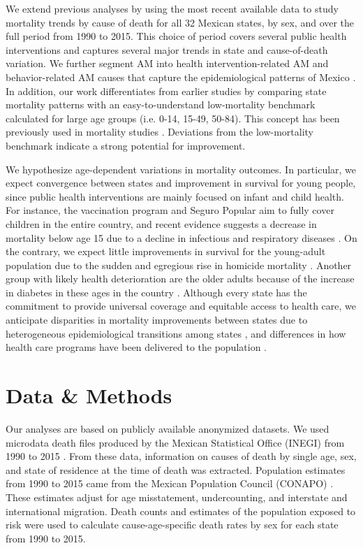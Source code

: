\documentclass{bmcart}
\begin{document}
We extend previous analyses by using the most recent available data to study mortality trends by cause of death for all 32 Mexican states, by sex, and over the full period from 1990 to 2015. This choice of period covers several public health interventions and captures several major trends in state and cause-of-death variation. We further segment AM into health intervention-related AM and
behavior-related AM causes that capture the epidemiological patterns of Mexico \cite{Aburto2015}. In addition, our work differentiates from earlier studies by comparing state mortality patterns with an easy-to-understand low-mortality benchmark calculated for large age groups (i.e. 0-14, 15-49, 50-84). This concept has been previously used in mortality studies \cite{whelpton1947,wunsch1975minimum,vallin2008minimum}. Deviations from the low-mortality benchmark indicate a strong potential for improvement.

We hypothesize age-dependent variations in mortality outcomes.
In particular, we expect convergence between states and improvement in survival
for young people, since public health interventions are mainly focused on infant and child health. For instance, the vaccination program and Seguro Popular aim to fully cover children in the entire country, and recent
evidence suggests a decrease in mortality below age 15 due to a decline
in infectious and respiratory diseases \cite{gonzalez2016mexico}. On the contrary, we
expect little improvements in survival for the young-adult population due to the sudden and egregious rise in homicide mortality \cite{gamlin2015violence}. Another group with likely health deterioration are the older adults because of the increase in diabetes in these ages in the country \cite{gonzalez2016mexico}. Although every
state has the commitment to provide universal coverage and equitable access to health care, we anticipate disparities in mortality improvements between states due to heterogeneous epidemiological transitions among states \cite{gomez2016dissonant}, and differences in how  health care programs have been delivered to the population
\cite{Frenk2006}.


\section*{Data \& Methods} 
Our analyses are based on publicly available anonymized datasets. We used microdata death files produced by the
Mexican Statistical Office (INEGI) from 1990 to 2015 \cite{INEGI}. From these data, 
information on causes of death by single age, sex, and state of residence at the
time of death was extracted. Population estimates from 1990 to 2015 came from the Mexican Population Council (CONAPO) \cite{CONAPO}. These estimates adjust for age misstatement, undercounting, and interstate and international migration. Death counts and estimates of the population exposed to risk were used to calculate cause-age-specific death rates by sex for each state from 1990 to 2015.
\end{document}
